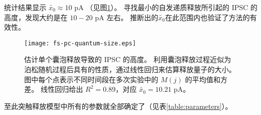 统计结果显示 $\tilde{x_0} \approx 10$ pA （见图\ref{figure:fs-pc-quantum-size}）。
寻找最小的自发递质释放所引起的 IPSC 的高度，发现大约是在 $10 - 20$ pA 左右。
推断出的$\tilde{x_0}$在此范围内也验证了方法的有效性。

\begin{figure}
\centering
\texttt{[image: fs-pc-quantum-size.eps]}
\caption{估计单个囊泡释放导致的 IPSC 的高度。
利用囊泡释放过程近似为泊松随机过程后具有的性质，通过线性回归来估算释放量子的大小。
图中每个点表示不同时间段在多次实验中的 $M(j)$ 的平均值和方差。
线性回归给出 $R^2 = 0.89$，对应 $\tilde{x_0} = 10.21$ pA。}
\label{figure:fs-pc-quantum-size}
\end{figure}

至此突触释放模型中所有的参数就全部确定了（见表\ref{table:parameters}）。